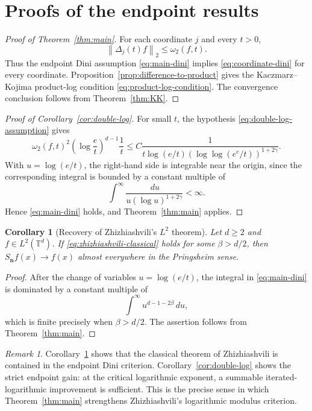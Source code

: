 \documentclass[11pt,reqno]{amsart}
\numberwithin{equation}{section}
\theoremstyle{plain}
\newtheorem{corollary}[theorem]{Corollary}
\theoremstyle{definition}
\theoremstyle{remark}
\newtheorem{remark}[theorem]{Remark}
\newcommand{\T}{\mathbb T}
\newcommand{\dd}{\,d}
\newcommand{\norm}[1]{\left\lVert #1\right\rVert}
\begin{document}
\section{Proofs of the endpoint results}

\begin{proof}[Proof of Theorem~\ref{thm:main}]
For each coordinate $j$ and every $t>0$,
\[
 \norm{\Delta_j(t)f}_2\le \omega_2(f,t).
\]
Thus the endpoint Dini assumption \eqref{eq:main-dini} implies \eqref{eq:coordinate-dini} for every coordinate. Proposition~\ref{prop:difference-to-product} gives the Kaczmarz--Kojima product-log condition \eqref{eq:product-log-condition}. The convergence conclusion follows from Theorem~\ref{thm:KK}.
\end{proof}

\begin{proof}[Proof of Corollary~\ref{cor:double-log}]
For small $t$, the hypothesis \eqref{eq:double-log-assumption} gives
\[
 \omega_2(f,t)^2\left(\log\frac et\right)^{d-1}\frac1t
 \le
 C\frac1{t\log(e/t)\left(\log\log(e^e/t)\right)^{1+2\gamma}}.
\]
With $u=\log(e/t)$, the right-hand side is integrable near the origin, since the corresponding integral is bounded by a constant multiple of
\[
 \int^{\infty}\frac{\dd u}{u(\log u)^{1+2\gamma}}<\infty .
\]
Hence \eqref{eq:main-dini} holds, and Theorem~\ref{thm:main} applies.
\end{proof}

\begin{corollary}[Recovery of Zhizhiashvili's $L^2$ theorem]\label{cor:recover-zh}
Let $d\ge2$ and $f\in L^2(\T^d)$. If \eqref{eq:zhizhiashvili-classical} holds for some $\beta>d/2$, then $S_{\mathbf n}f(x)\to f(x)$ almost everywhere in the Pringsheim sense.
\end{corollary}

\begin{proof}
After the change of variables $u=\log(e/t)$, the integral in \eqref{eq:main-dini} is dominated by a constant multiple of
\[
 \int^{\infty}u^{d-1-2\beta}\dd u,
\]
which is finite precisely when $\beta>d/2$. The assertion follows from Theorem~\ref{thm:main}.
\end{proof}

\begin{remark}
Corollary~\ref{cor:recover-zh} shows that the classical theorem of Zhizhiashvili is contained in the endpoint Dini criterion. Corollary~\ref{cor:double-log} shows the strict endpoint gain: at the critical logarithmic exponent, a summable iterated-logarithmic improvement is sufficient. This is the precise sense in which Theorem~\ref{thm:main} strengthens Zhizhiashvili's logarithmic modulus criterion.
\end{remark}
\end{document}

